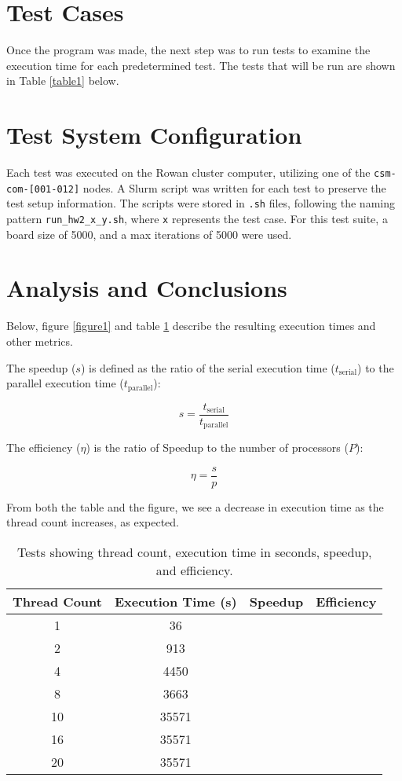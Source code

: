 \documentclass{article}
\begin{document}
	\section{Test Cases}
	Once the program was made, the next step was to run tests to examine the execution time for each predetermined test. The tests that will be run are shown in Table \ref{table1} below.

	\section{Test System Configuration}
	Each test was executed on the Rowan cluster computer, utilizing one of the \texttt{csm-com-[001-012]} nodes. A Slurm script was written for each test to preserve the test setup information. The scripts were stored in \texttt{.sh} files, following the naming pattern \texttt{run\_hw2\_x\_y.sh}, where \texttt{x} represents the test case. For this test suite, a board size of 5000, and a max iterations of 5000 were used.

	\section{Analysis and Conclusions}
	Below, figure \ref{figure1} and table \ref{table2} describe the resulting execution times and other metrics.
	
	The speedup (\(s\)) is defined as the ratio of the serial execution time (\(t_{\text{serial}}\)) to the parallel execution time (\(t_{\text{parallel}}\)):

\[s = \frac{t_{\text{serial}}}{t_{\text{parallel}}}\]

The efficiency (\(\eta\)) is the ratio of Speedup to the number of processors (\(P\)):

\[\eta = \frac{s}{p}\]

From both the table and the figure, we see a decrease in execution time as the thread count increases, as expected.
	
	
	\begin{table}[t]
		\centering
		\begin{tabular}{|c|c|c|c|}
			\hline
			\textbf{Thread Count} & \textbf{Execution Time (s)} & \textbf{Speedup} & \textbf{Efficiency} \\
			\hline
			1  & 36    &  & \\
			2  & 913   &  & \\
			4  & 4450  &  & \\
			8  & 3663  &  & \\
			10 & 35571 &  & \\
			16 & 35571 &  & \\
			20 & 35571 &  & \\
			\hline
		\end{tabular}
		\caption{Tests showing thread count, execution time in seconds, speedup, and efficiency.}
		\label{table2}
	\end{table}
	
\end{document}
